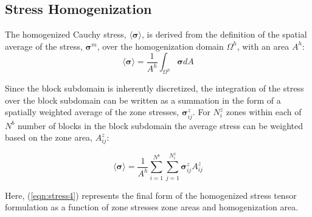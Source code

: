 \subsection{Stress Homogenization}

The homogenized Cauchy stress, $\langle\boldsymbol{\sigma}\rangle$, is derived from the definition of the spatial average of the stress, $\boldsymbol{\sigma}^m$, over the homogenization domain $\Omega^{h}$, with an area $A^{h}$: 
\begin{equation}
\langle\boldsymbol{\sigma}\rangle=\frac{1}{A^{h}}\int_{\Omega^{h}}\boldsymbol{\sigma}dA\label{eqn:stress1}
\end{equation}






Since the block subdomain is inherently discretized, the integration of the stress over the block subdomain can be written as a summation in the form of a spatially weighted average of the zone stresses, $\boldsymbol{\sigma}_{ij}^{z}$. For $N_{i}^{z}$ zones within each of $N^{b}$ number of blocks in the block subdomain the average stress can be weighted based on the zone area, $A_{ij}^{z}$: 

\begin{equation}
\langle\boldsymbol{\sigma}\rangle=\frac{1}{A^{h}}\sum_{i=1}^{N^{b}}\sum_{j=1}^{N_{i}^{z}}\boldsymbol{\sigma}_{ij}^{z}A_{ij}^{z}\label{eqn:stress4}
\end{equation}

Here, (\ref{eqn:stress4}) represents the final form of the homogenized stress tensor formulation as a function of zone stresses zone areas and homogenization area.